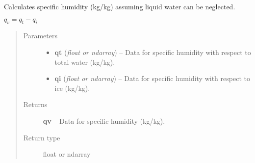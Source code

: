 \documentclass[letterpaper,10pt,english]{sphinxmanual}
\begin{document}

\begin{fulllineitems}
\label{atmos:atmos.equations.qv_from_qt_qi}
Calculates specific humidity (kg/kg) assuming liquid water can be neglected.

\(q_v = q_t - q_i\)
\begin{quote}\begin{description}
\item[{Parameters}] \leavevmode\begin{itemize}
\item {} 
\textbf{qt} (\emph{float or ndarray}) -- Data for specific humidity with respect to total water (kg/kg).

\item {} 
\textbf{qi} (\emph{float or ndarray}) -- Data for specific humidity with respect to ice (kg/kg).

\end{itemize}

\item[{Returns}] \leavevmode
\textbf{qv} --
Data for specific humidity (kg/kg).

\item[{Return type}] \leavevmode
float or ndarray

\end{description}\end{quote}

\end{fulllineitems}

\end{document}
